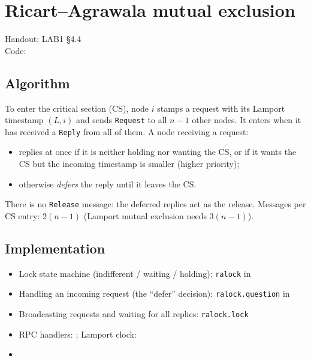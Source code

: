 \section{Ricart--Agrawala mutual exclusion}\label{sec:ra}
Handout: LAB1 §4.4 \\
Code: 

\subsection{Algorithm}
To enter the critical section (CS), node $i$ stamps a request with its Lamport
timestamp $(L, i)$ and sends \texttt{Request} to all $n-1$ other nodes. It enters
when it has received a \texttt{Reply} from all of them. A node receiving a request:
\begin{itemize}[itemsep=1pt]
  \item replies at once if it is neither holding nor wanting the CS, or if it wants
        the CS but the incoming timestamp is smaller (higher priority);
  \item otherwise \emph{defers} the reply until it leaves the CS.
\end{itemize}
There is no \texttt{Release} message: the deferred replies act as the release.
Messages per CS entry: $2(n-1)$ (Lamport mutual exclusion needs $3(n-1)$).


\subsection{Implementation}
\begin{itemize}[itemsep=2pt]
  \item Lock state machine (indifferent / waiting / holding):
        \texttt{ralock} in 
  \item Handling an incoming request (the ``defer'' decision): \texttt{ralock.question}
        in 
  \item Broadcasting requests and waiting for all replies: \texttt{ralock.lock}
  \item RPC handlers: ;
        Lamport clock: 
  \item {}
\end{itemize}

